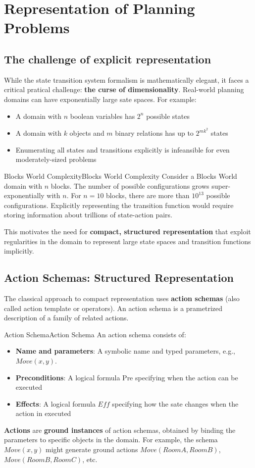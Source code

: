 \documentclass[a4paper]{article}
\theoremstyle{definition}
\begin{document}
\section{Representation of Planning Problems}
\subsection{The challenge of explicit representation}
While the state transition system formalism is mathematically elegant, it faces a critical pratical 
challenge: \textbf{the curse of dimensionality}. Real-world planning domains can have exponentially large sate
spaces. For example:
\begin{itemize}
    \item A domain with \( n \) boolean variables has \( 2^n \) possible states 
    \item A domain with \( k \) objects and \( m \) binary relations has up to \( 2^{mk^2} \) states
    \item Enumerating all states and transitions explicitly is infeansible for even moderately-sized problems
\end{itemize}
\begin{example}{Blocks World Complexity}{Blocks World Complexity}
Consider a Blocks World domain with \( n \) blocks. The number of possible 
configurations grows super-exponentially with \( n \). For \( n = 10 \) blocks,
there are more than \( 10^13 \) possible configurations. Explicitly representing the transition 
function would require storing information about trillions of state-action pairs.
\end{example}
This motivates the need for \textbf{compact, structured representation} that exploit regularities 
in the domain to represent large state spaces and transition functions implicitly.
\subsection{Action Schemas: Structured Representation}
The classical approach to compact representation uses \textbf{action schemas} (also called action 
template or operators). An action schema is a prametrized description of a family of related actions.
\begin{definition}{Action Schema}{Action Schema}
An action schema consists of:
\begin{itemize}
    \item \textbf{Name and parameters}: A symbolic name and typed parameters, e.g., \( Move(x,y) \).
    \item \textbf{Preconditions}: A logical formula Pre specifying when the action can be executed
    \item \textbf{Effects}: A logical formula \( Eff \) specifying how the sate changes when the action in executed
\end{itemize} 
\end{definition}
\textbf{Actions} are \textbf{ground instances} of action schemas, obtained by binding the parameters to specific objects in the 
domain. For example, the schema \( Move(x,y) \) might generate ground actions \( Move(RoomA,RoomB) \), \( Move(RoomB,RoomC) \), etc.
\end{document}
